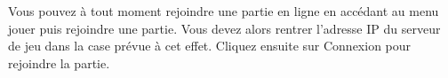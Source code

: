 
Vous pouvez à tout moment rejoindre une partie en ligne en accédant au menu jouer puis rejoindre une partie. Vous devez alors rentrer l'adresse IP du serveur de jeu dans la case prévue à cet effet. Cliquez ensuite sur Connexion pour rejoindre la partie.